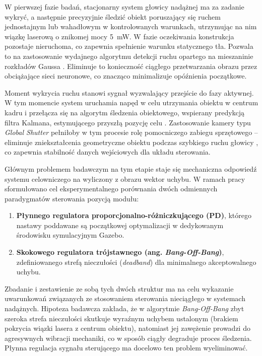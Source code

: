 \documentclass[a4paper,twoside,12pt]{book}
\begin{document}
W pierwszej fazie badań, stacjonarny system głowicy nadążnej ma za zadanie wykryć, a następnie precyzyjnie śledzić obiekt poruszający się ruchem jednostajnym lub wahadłowym w kontrolowanych warunkach, utrzymując na nim wiązkę laserową o znikomej mocy 5~mW. W fazie oczekiwania konstrukcja pozostaje nieruchoma, co zapewnia spełnienie warunku statycznego tła. Pozwala to na zastosowanie wydajnego algorytmu detekcji ruchu opartego na mieszaninie rozkładów Gaussa \cite{bib:Seidaliyeva2020}. Eliminuje to konieczność ciągłego przetwarzania obrazu przez obciążające sieci neuronowe, co znacząco minimalizuje opóźnienia początkowe.

Moment wykrycia ruchu stanowi sygnał wyzwalający przejście do fazy aktywnej. W tym momencie system uruchamia napęd w celu utrzymania obiektu w centrum kadru i przełącza się na algorytm śledzenia obiektowego, wspierany predykcją filtra Kalmana, estymującego przyszłą pozycję celu \cite{bib:Li2025}. Zastosowanie kamery typu \textit{Global Shutter} pełniłoby w tym procesie rolę pomocniczego zabiegu sprzętowego – eliminuje zniekształcenia geometryczne obiektu podczas szybkiego ruchu głowicy \cite{bib:Kemeshi2024}, co zapewnia stabilność danych wejściowych dla układu sterowania.

Głównym problemem badawczym na tym etapie staje się mechaniczna odpowiedź systemu celowniczego na wyliczony z obrazu wektor uchybu. W ramach pracy sformułowano cel eksperymentalnego porównania dwóch odmiennych paradygmatów sterowania pozycją modułu:
\begin{enumerate}
    \item \textbf{Płynnego regulatora proporcjonalno-różniczkującego (PD)}, którego nastawy poddawane są początkowej optymalizacji w dedykowanym środowisku symulacyjnym Gazebo.
    \item \textbf{Skokowego regulatora trójstawnego (ang. \textit{Bang-Off-Bang})}, zdefiniowanego strefą nieczułości (\textit{deadband}) dla minimalnego akceptowalnego uchybu.
\end{enumerate}
Zbadanie i zestawienie ze sobą tych dwóch struktur ma na celu wykazanie uwarunkowań związanych ze stosowaniem sterowania nieciągłego w systemach nadążnych. Hipoteza badawcza zakłada, że w algorytmie \textit{Bang-Off-Bang} zbyt szeroka strefa nieczułości skutkuje wyraźnym uchybem ustalonym (brakiem pokrycia wiązki lasera z centrum obiektu), natomiast jej zawężenie prowadzi do agresywnych wibracji mechaniki, co w sposób ciągły degraduje proces śledzenia. Płynna regulacja sygnału sterującego ma docelowo ten problem wyeliminować.
\end{document}
